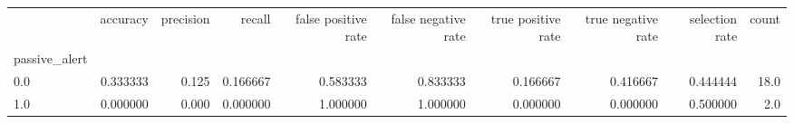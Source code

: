 \begin{tabular}{lrrrrrrrrr}
\toprule
{} &  accuracy &  precision &    recall &  false positive rate &  false negative rate &  true positive rate &  true negative rate &  selection rate &  count \\
passive\_alert &           &            &           &                      &                      &                     &                     &                 &        \\
\midrule
0.0           &  0.333333 &      0.125 &  0.166667 &             0.583333 &             0.833333 &            0.166667 &            0.416667 &        0.444444 &   18.0 \\
1.0           &  0.000000 &      0.000 &  0.000000 &             1.000000 &             1.000000 &            0.000000 &            0.000000 &        0.500000 &    2.0 \\
\bottomrule
\end{tabular}
